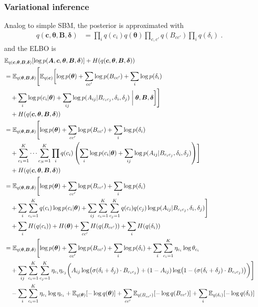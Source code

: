 \documentclass{article}
\renewcommand{\v}[1]{\bm{#1}}
\newcommand{\E}{\mathbb{E}}
\begin{document}
\subsubsection{Variational inference}	
Analog to simple SBM, the posterior is approximated with
\begin{equation}
\begin{split}
q(\v{c}, \v{\theta}, \v{B}, \v{\delta})
&= \prod_i q(c_i) q(\v{\theta}) \prod_{c,c'} q(B_{cc'}) \prod_i q(\delta_i)\; .
\end{split}
\end{equation}
and the ELBO is
\begin{equation}
\begin{aligned}
& \E_{q(\v{c}, \v{\theta}, \v{B}, \v{\delta})}[\log p(\v{A}, \v{c}, \v{\theta}, \v{B}, \v{\delta})] + H(q(\v{c}, \v{\theta}, \v{B}, \v{\delta})) \\
&= \E_{q(\v{\theta}, \v{B}, \v{\delta})}\Biggl[ \E_{q(\v{c})} \biggl[ \log p(\v{\theta})
+ \sum_{cc'} \log p(B_{cc'}) + \sum_i \log p(\delta_i)\\ 
& \quad + \sum_i \log p(c_i | \v{\theta}) + \sum_{ij} \log p(A_{ij} | B_{c_i c_j}, \delta_i, \delta_j) \biggm\vert \v{\theta}, \v{B}, \v{\delta} \biggr] \Biggr] \\
& \quad + H(q(\v{c}, \v{\theta}, \v{B}, \v{\delta})) \\
&= \E_{q(\v{\theta}, \v{B}, \v{\delta})}\Biggl[ \log p(\v{\theta}) + \sum_{cc'} \log p(B_{cc'}) + \sum_i \log p(\delta_i)\\
& \quad + \sum_{c_1=1}^K \cdots \sum_{c_N=1}^K \prod_i q(c_i) \left( \sum_i \log p(c_i | \v{\theta})
+ \sum_{ij} \log p(A_{ij} | B_{c_i c_j}, \delta_i, \delta_j) \right) \Biggr]\\
& \quad + H(q(\v{c}, \v{\theta}, \v{B}, \v{\delta})) \\
&= \E_{q(\v{\theta}, \v{B}, \v{\delta})}\Biggl[ \log p(\v{\theta})
+ \sum_{cc'} \log p(B_{cc'}) + \sum_i \log p(\delta_i)\\
& \quad + \sum_i \sum_{c_i=1}^K q(c_i) \log p(c_i | \v{\theta})
+ \sum_{ij} \sum_{c_i=1}^K \sum_{c_j=1}^K q(c_i) q(c_j) \log p(A_{ij} | B_{c_i c_j}, \delta_i, \delta_j)\Biggr] \\
& \quad + \sum_i H(q(c_i)) + H(\v{\theta}) + \sum_{cc'} H(q(B_{cc'})) + \sum_i H(q(\delta_i))\\
&= \E_{q(\v{\theta}, \v{B}, \v{\delta})}\Biggl[ \log p(\v{\theta})
+ \sum_{cc'} \log p(B_{cc'}) + \sum_i \log p(\delta_i)
+ \sum_i \sum_{c_i=1}^K \eta_{c_i} \log \theta_{c_i}\\
& \quad + \sum_{ij} \sum_{c_i=1}^K \sum_{c_j=1}^K \eta_{c_i} \eta_{c_j}
\biggl( A_{ij} \log \bigl(\sigma(\delta_i + \delta_j) \cdot B_{c_ic_j}\bigr) + (1 - A_{ij}) \log \bigl(1 - (\sigma(\delta_i + \delta_j) \cdot B_{c_ic_j})\bigr) \biggr)\Biggr] \\
& \quad - \sum_i \sum_{c_i=1}^K \eta_{c_i} \log \eta_{c_i} + \E_{q(\v{\theta})}[- \log q(\v{\theta})] + \sum_{cc'} \E_{q(B_{cc'})}[- \log q(B_{cc'})] + \sum_i \E_{q(\delta_i)}[- \log q(\delta_i)]
\end{aligned}
\end{equation}
\end{document}
